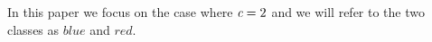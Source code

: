 In this paper we focus on the case where $\emph{c}=2$ and we will refer to the two classes as $blue$ and $red$.

